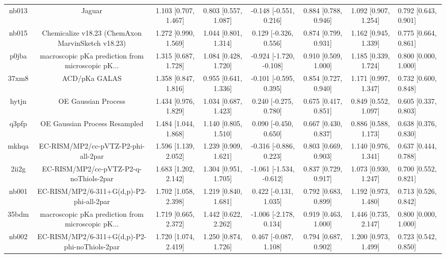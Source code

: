 \documentclass{article}
\begin{document}
\begin{center}
\begin{longtable}{|ccccccc|}
 nb013 &                                             Jaguar &  1.103 [0.707, 1.467] &  0.803 [0.557, 1.087] &   -0.148 [-0.551, 0.216] &  0.884 [0.788, 0.946] &   1.092 [0.907, 1.254] &   0.792 [0.643, 0.901] \\
 nb015 &  Chemicalize v18.23 (ChemAxon MarvinSketch v18.23) &  1.272 [0.990, 1.569] &  1.044 [0.801, 1.314] &    0.129 [-0.326, 0.556] &  0.874 [0.799, 0.931] &   1.162 [0.945, 1.339] &   0.775 [0.664, 0.861] \\
 p0jba &  macroscopic pKa prediction from microscopic pK... &  1.315 [0.687, 1.728] &  1.084 [0.428, 1.720] &  -0.924 [-1.720, -0.108] &  0.910 [0.509, 1.000] &   1.185 [0.339, 1.724] &   0.800 [0.000, 1.000] \\
 37xm8 &                                      ACD/pKa GALAS &  1.358 [0.847, 1.816] &  0.955 [0.641, 1.336] &   -0.101 [-0.595, 0.395] &  0.854 [0.727, 0.940] &   1.171 [0.997, 1.347] &   0.732 [0.600, 0.848] \\
 hytjn &                                OE Gaussian Process &  1.434 [0.976, 1.829] &  1.034 [0.687, 1.423] &    0.240 [-0.275, 0.780] &  0.675 [0.417, 0.851] &   0.849 [0.552, 1.097] &   0.605 [0.337, 0.803] \\
 q3pfp &                      OE Gaussian Process Resampled &  1.484 [1.044, 1.868] &  1.140 [0.805, 1.510] &    0.090 [-0.450, 0.650] &  0.667 [0.430, 0.837] &   0.886 [0.588, 1.173] &   0.638 [0.376, 0.830] \\
 mkhqa &                EC-RISM/MP2/cc-pVTZ-P2-phi-all-2par &  1.596 [1.139, 2.052] &  1.239 [0.909, 1.621] &   -0.316 [-0.886, 0.223] &  0.803 [0.669, 0.903] &   1.140 [0.976, 1.341] &   0.637 [0.444, 0.788] \\
 2ii2g &             EC-RISM/MP2/cc-pVTZ-P2-q-noThiols-2par &  1.683 [1.202, 2.142] &  1.304 [0.951, 1.705] &  -1.061 [-1.534, -0.612] &  0.837 [0.729, 0.917] &   1.073 [0.930, 1.247] &   0.700 [0.552, 0.821] \\
 nb001 &           EC-RISM/MP2/6-311+G(d,p)-P2-phi-all-2par &  1.702 [1.058, 2.398] &  1.219 [0.840, 1.681] &    0.422 [-0.131, 1.035] &  0.792 [0.683, 0.899] &   1.192 [0.973, 1.480] &   0.713 [0.526, 0.842] \\
 35bdm &  macroscopic pKa prediction from microscopic pK... &  1.719 [0.665, 2.372] &  1.442 [0.622, 2.262] &   -1.006 [-2.178, 0.134] &  0.919 [0.463, 1.000] &   1.446 [0.735, 2.147] &   0.800 [0.000, 1.000] \\
 nb002 &      EC-RISM/MP2/6-311+G(d,p)-P2-phi-noThiols-2par &  1.720 [1.074, 2.419] &  1.250 [0.874, 1.726] &    0.467 [-0.087, 1.108] &  0.794 [0.687, 0.902] &   1.200 [0.973, 1.499] &   0.723 [0.542, 0.850] \\

\end{longtable}
\end{center}
\end{document}
